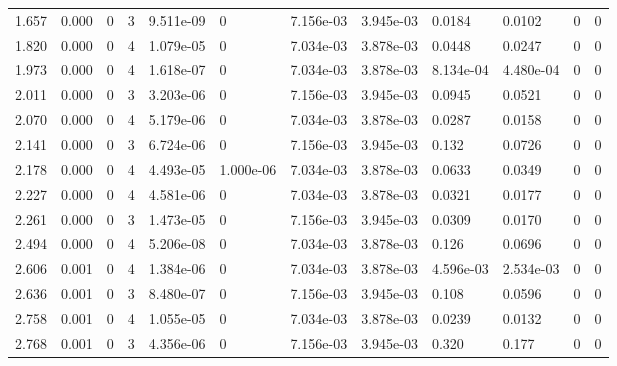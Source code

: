 \documentclass[preview]{standalone}
\begin{document}
{{\begin{tabular}{L{1.2cm}C{1.2cm} C{0.3cm}C{0.5cm} C{1.4cm}C{1.4cm} C{1.4cm}C{1.4cm} C{1.6cm}C{1.6cm} C{1.6cm}C{1.6cm}}
  1.657  &  0.000  & 0     &  3 &  9.511e-09  & 0  &  7.156e-03&   3.945e-03& 0.0184 & 0.0102   &  0 & 0  \\ 
  1.820  &  0.000  & 0     &  4 &  1.079e-05  & 0  &  7.034e-03&   3.878e-03& 0.0448 & 0.0247   &  0 & 0  \\ 
  1.973  &  0.000  & 0     &  4 &  1.618e-07  & 0  &  7.034e-03&   3.878e-03& 8.134e-04 & 4.480e-04   &  0 & 0  \\ 
  2.011  &  0.000  & 0     &  3 &  3.203e-06  & 0  &  7.156e-03&   3.945e-03& 0.0945 & 0.0521   &  0 & 0  \\ 
  2.070  &  0.000  & 0     &  4 &  5.179e-06  & 0  &  7.034e-03&   3.878e-03& 0.0287 & 0.0158   &  0 & 0  \\ 
  2.141  &  0.000  & 0     &  3 &  6.724e-06  & 0  &  7.156e-03&   3.945e-03& 0.132 & 0.0726   &  0 & 0  \\ 
  2.178  &  0.000  & 0     &  4 &  4.493e-05  & 1.000e-06  &  7.034e-03&   3.878e-03& 0.0633 & 0.0349   &  0 & 0  \\ 
  2.227  &  0.000  & 0     &  4 &  4.581e-06  & 0  &  7.034e-03&   3.878e-03& 0.0321 & 0.0177   &  0 & 0  \\ 
  2.261  &  0.000  & 0     &  3 &  1.473e-05  & 0  &  7.156e-03&   3.945e-03& 0.0309 & 0.0170   &  0 & 0  \\ 
  2.494  &  0.000  & 0     &  4 &  5.206e-08  & 0  &  7.034e-03&   3.878e-03& 0.126 & 0.0696   &  0 & 0  \\ 
  2.606  &  0.001  & 0     &  4 &  1.384e-06  & 0  &  7.034e-03&   3.878e-03& 4.596e-03 & 2.534e-03   &  0 & 0  \\ 
  2.636  &  0.001  & 0     &  3 &  8.480e-07  & 0  &  7.156e-03&   3.945e-03& 0.108 & 0.0596   &  0 & 0  \\ 
  2.758  &  0.001  & 0     &  4 &  1.055e-05  & 0  &  7.034e-03&   3.878e-03& 0.0239 & 0.0132   &  0 & 0  \\ 
  2.768  &  0.001  & 0     &  3 &  4.356e-06  & 0  &  7.156e-03&   3.945e-03& 0.320 & 0.177   &  0 & 0  \\ 
\hline 
\end{tabular} 

}}
\end{document}
